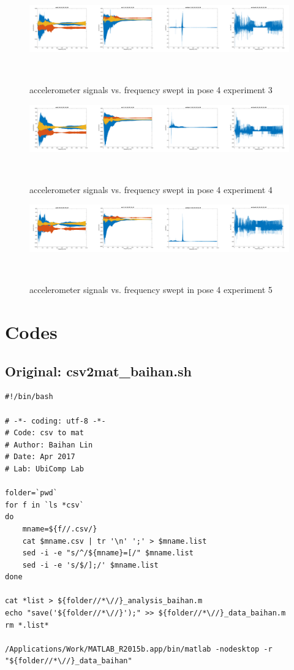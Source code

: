 \documentclass{sigchi}
\begin{document}
\begin{figure}
  \centering
  \includegraphics[width=1.95\columnwidth]{figures/pose4_3}
  \caption{accelerometer signals vs. frequency swept in pose 4 experiment 3}
    ~\label{fig:pose4_3}
\end{figure}

\begin{figure}
  \centering
  \includegraphics[width=1.95\columnwidth]{figures/pose4_4}
  \caption{accelerometer signals vs. frequency swept in pose 4 experiment 4}
    ~\label{fig:pose4_4}
\end{figure}

\begin{figure}
  \centering
  \includegraphics[width=1.95\columnwidth]{figures/pose4_5}
  \caption{accelerometer signals vs. frequency swept in pose 4 experiment 5}
    ~\label{fig:pose4_5}
\end{figure}

\section{Codes}

\subsection{Original: csv2mat\_baihan.sh}\label{ss:csv2mat}
\begin{lstlisting}
#!/bin/bash

# -*- coding: utf-8 -*-
# Code: csv to mat
# Author: Baihan Lin
# Date: Apr 2017
# Lab: UbiComp Lab

folder=`pwd`
for f in `ls *csv`
do
    mname=${f//.csv/}
    cat $mname.csv | tr '\n' ';' > $mname.list 
    sed -i -e "s/^/${mname}=[/" $mname.list
    sed -i -e 's/$/];/' $mname.list
done

cat *list > ${folder//*\//}_analysis_baihan.m
echo "save('${folder//*\//}');" >> ${folder//*\//}_data_baihan.m
rm *.list*

/Applications/Work/MATLAB_R2015b.app/bin/matlab -nodesktop -r "${folder//*\//}_data_baihan"
\end{lstlisting}
\end{document}
